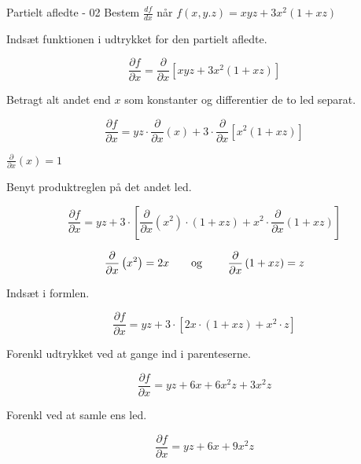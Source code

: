 \documentclass{article}
\begin{document}
\begin{exercise}{Partielt afledte - 02}
	Bestem $\frac{df}{dx}$ når $f(x,y.z) =xyz+3x^2(1+xz) $ 
	
	
	\hint
	Indsæt funktionen i udtrykket for den partielt afledte.
	
	\hint
	
	\[
	\frac{\partial f}{\partial x} = \frac{\partial }{\partial x} \left[ xyz+3x^2(1+xz)\right]
	\]
	
	\hint
	Betragt alt andet end $x$ som konstanter og differentier de to led separat.
	
	\hint
	\[
	\frac{\partial f}{\partial x} = yz \cdot \frac{\partial}{\partial x} \left( x \right) + 3 \cdot \frac{\partial }{\partial x} \left[ x^2\left(1+xz \right) \right]
	\]
	
	\hint
	$\frac{\partial}{\partial x} (x) = 1$
	
	\hint
	
	Benyt produktreglen på det andet led.
	
	\hint
	\[
	\frac{\partial f}{\partial x} = yz + 3 \cdot \left[\frac{\partial }{\partial x}\left(x^2 \right) \cdot \left(1+xz \right) + x^2 \cdot \frac{\partial}{\partial x} \left( 1+xz\right) \right]
	\]
	
	\hint
	\[ \frac{\partial }{\partial x} \left(x^2\right) = 2x \textrm{\qquad og \qquad}  \frac{\partial }{\partial x} \left(1+xz\right) = z
	\]
	
	\hint
	Indsæt i formlen.
	
	\hint
	\[
	\frac{\partial f}{\partial x} = yz +  3 \cdot \left[2x \cdot \left( 1+xz\right) + x^2 \cdot z \right]
	\]
	
	\hint
	Forenkl udtrykket ved at gange ind i parenteserne.
	
	\hint
	\[
	\frac{\partial f}{\partial x} = yz +  6x+6x^2z + 3x^2z 
	\]
	
	\hint Forenkl ved at samle ens led.
	
	\hint
	\[
	\frac{\partial f}{\partial x} = yz + 6x + 9x^2z
	\]
	
\end{exercise}

\newpage
\end{document}
